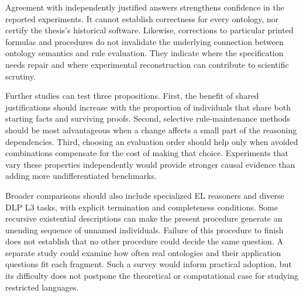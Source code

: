Agreement with independently justified answers strengthens confidence in the
reported experiments. It cannot establish correctness for every ontology,
nor certify the thesis's historical software. Likewise, corrections to
particular printed formulas and procedures do not invalidate the underlying
connection between ontology semantics and rule evaluation. They indicate
where the specification needs repair and where experimental reconstruction
can contribute to scientific scrutiny.

Further studies can test three propositions. First, the benefit of shared
justifications should increase with the proportion of individuals that share
both starting facts and surviving proofs. Second, selective rule-maintenance
methods should be most advantageous when a change affects a small part of
the reasoning dependencies. Third, choosing an evaluation order should help
only when avoided combinations compensate for the cost of making that choice.
Experiments that vary these properties independently would provide stronger
causal evidence than adding more undifferentiated benchmarks.

Broader comparisons should also include specialized EL reasoners and diverse
DLP L3 tasks, with explicit termination and completeness conditions. Some recursive
existential descriptions can make the present procedure generate an unending
sequence of unnamed individuals. Failure of this procedure to finish does not
establish that no other procedure could decide the same question. A separate
study could examine how often real ontologies and their application questions
fit each fragment. Such a survey would inform practical adoption, but its
difficulty does not postpone the theoretical or computational case for
studying restricted languages.
